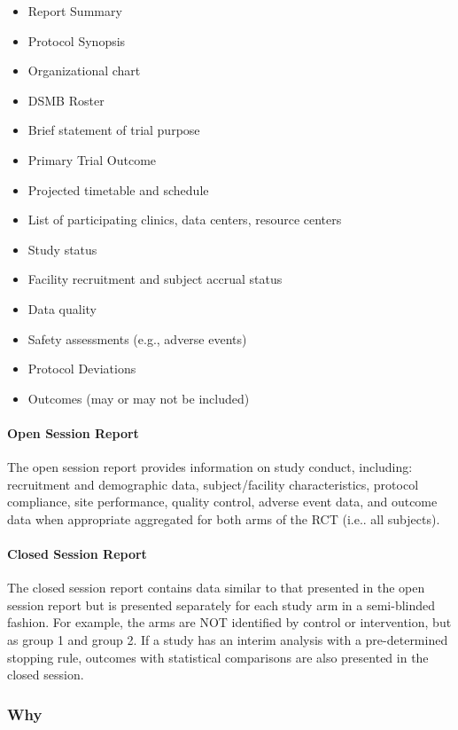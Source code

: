 \documentclass[]{book}
\providecommand{\tightlist}{%
  \setlength{\itemsep}{0pt}\setlength{\parskip}{0pt}}
\begin{document}
\begin{itemize}
\tightlist
\item
  Report Summary
\item
  Protocol Synopsis
\item
  Organizational chart
\item
  DSMB Roster
\item
  Brief statement of trial purpose
\item
  Primary Trial Outcome
\item
  Projected timetable and schedule
\item
  List of participating clinics, data centers, resource centers
\item
  Study status
\item
  Facility recruitment and subject accrual status
\item
  Data quality
\item
  Safety assessments (e.g., adverse events)
\item
  Protocol Deviations
\item
  Outcomes (may or may not be included)
\end{itemize}

\paragraph{Open Session Report}\label{open-session-report}

The open session report provides information on study conduct,
including: recruitment and demographic data, subject/facility
characteristics, protocol compliance, site performance, quality control,
adverse event data, and outcome data when appropriate aggregated for
both arms of the RCT (i.e.. all subjects).

\paragraph{Closed Session Report}\label{closed-session-report}

The closed session report contains data similar to that presented in the
open session report but is presented separately for each study arm in a
semi-blinded fashion. For example, the arms are NOT identified by
control or intervention, but as group 1 and group 2. If a study has an
interim analysis with a pre-determined stopping rule, outcomes with
statistical comparisons are also presented in the closed session.

\subsubsection{Why}\label{why-15}
\end{document}
